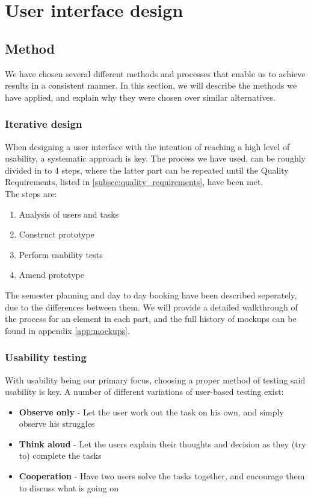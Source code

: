 \chapter{User interface design}
\label{chap:user_interface_design}
\section{Method}
\label{sec:method}
We have chosen several different methods and processes that enable us to achieve results in a consistent manner. In this section, we will describe the methods we have applied, and explain why they were chosen over similar alternatives.

\subsection{Iterative design}
When designing a user interface with the intention of reaching a high level of usability, a systematic approach is key. The process we have used, can be roughly divided in to 4 steps, where the latter part can be repeated until the Quality Requirements, listed in \ref{subsec:quality_requirements}, have been met. \cite{lauesen} \\
The steps are:
\begin{enumerate}
\item Analysis of users and tasks
\item Construct prototype
\item Perform usability tests
\item Amend prototype 
\end{enumerate}

The semester planning and day to day booking have been described seperately, due to the differences between them. We will provide a detailed walkthrough of the process for an element in each part, and the full history of mockups can be found in appendix \ref{app:mockups}.

\subsection{Usability testing}
\label{sec:usability_testing}
With usability being our primary focus, choosing a proper method of testing said usability is key. A number of different variations of user-based testing exist:\cite{lauesen}
\begin{itemize}
\item \textbf{Observe only} - Let the user work out the task on his own, and simply observe his struggles
\item \textbf{Think aloud} - Let the users explain their thoughts and decision as they (try to) complete the tasks
\item \textbf{Cooperation} - Have two users solve the tasks together, and encourage them to discuss what is going on
\end{itemize}

